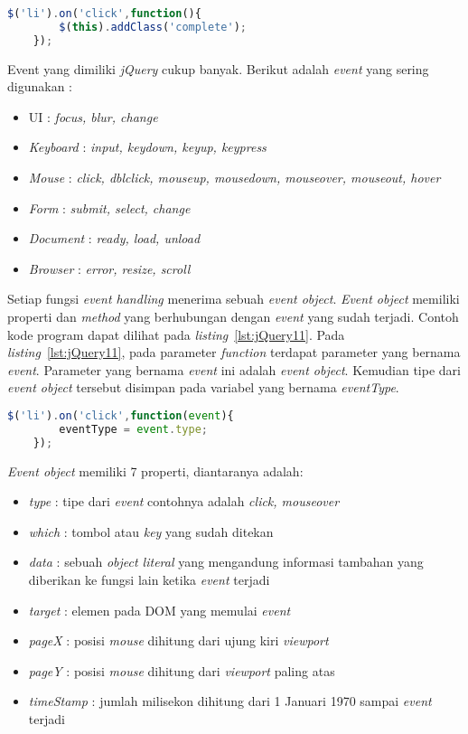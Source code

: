 \begin{lstlisting}[language=Javascript, caption=Menambahkan atribut \textit{class} pada setiap \textit{list} menggunakan event \textit{'click'}, label={lst:jQuery10}]
	$('li').on('click',function(){
		$(this).addClass('complete');
	});
\end{lstlisting}

Event yang dimiliki \textit{jQuery} cukup banyak. Berikut adalah \textit{event} yang sering digunakan :
\begin{itemize}
	\item UI : \textit{focus, blur, change}
	\item \textit{Keyboard} : \textit{input, keydown, keyup, keypress}
	\item \textit{Mouse} : \textit{click, dblclick, mouseup, mousedown, mouseover, mouseout, hover}
	\item \textit{Form} : \textit{submit, select, change}
	\item \textit{Document} : \textit{ready, load, unload}
	\item \textit{Browser} : \textit{error, resize, scroll}
\end{itemize}

Setiap fungsi \textit{event handling} menerima sebuah \textit{event object}. \textit{Event object} memiliki properti dan \textit{method} yang berhubungan dengan \textit{event} yang sudah terjadi. Contoh kode program dapat dilihat pada \textit{listing}~\ref{lst:jQuery11}. Pada \textit{listing}~\ref{lst:jQuery11}, pada parameter \textit{function} terdapat parameter yang bernama \textit{event}. Parameter yang bernama \textit{event} ini adalah \textit{event object}. Kemudian tipe dari \textit{event object} tersebut disimpan pada variabel yang bernama \textit{eventType}. 

\begin{lstlisting}[language=Javascript, caption=Mendapatkan tipe \textit{event} dari \textit{event object}, label={lst:jQuery11}]
	$('li').on('click',function(event){
		eventType = event.type;
	});
\end{lstlisting}

\textit{Event object} memiliki 7 properti, diantaranya adalah:

\begin{itemize}
	\item \textit{type} : tipe dari \textit{event} contohnya adalah \textit{click, mouseover}
	\item \textit{which} : tombol atau \textit{key} yang sudah ditekan
	\item \textit{data} : sebuah \textit{object literal} yang mengandung informasi tambahan yang diberikan ke fungsi lain ketika \textit{event} terjadi
	\item \textit{target} : elemen pada DOM yang memulai \textit{event}
	\item \textit{pageX} : posisi \textit{mouse} dihitung dari ujung kiri \textit{viewport} 
	\item \textit{pageY} : posisi \textit{mouse} dihitung dari \textit{viewport} paling atas
	\item \textit{timeStamp} : jumlah milisekon dihitung dari 1 Januari 1970 sampai \textit{event} terjadi
\end{itemize}

